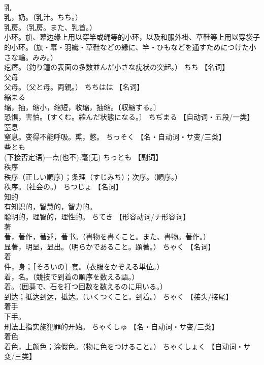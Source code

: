 \documentclass[8pt]{extreport}
\begin{document}
\begin{CJK}{UTF8}{min}
\\	乳	
\\	乳，奶。（乳汁。ちち。） 
\\	乳房。（乳房。また、乳首。） 
\\	小环。旗、幕边缘上用以穿竿或绳等的小环，以及和服外褂、草鞋等上用以穿袋子的小环。（旗・幕・羽織・草鞋などの縁に、竿・ひもなどを通すためにつけた小さな輪。みみ。） 
\\	疙瘩。（釣り鐘の表面の多数並んだ小さな疣状の突起。）	ちち		【名词】
\\	父母	
\\	父母。（父と母。両親。）	ちちはは		【名词】
\\	縮まる	
\\	缩，抽，缩小，缩短，收缩，抽缩。〔収縮する。〕 
\\	恐惧，害怕。〔すくむ。縮んだ状態になる。〕	ちぢまる		【自动词・五段/一类】
\\	窒息	
\\	窒息。变得不能呼吸。熏，憋。	ちっそく		【名・自动词・サ变/三类】
\\	些とも	
\\	(下接否定语)一点(也不);毫(无)	ちっとも		【副词】
\\	秩序	
\\	秩序（正しい順序）；条理（すじみち）；次序。（順序。） 
\\	秩序。（社会の。）	ちつじょ		【名词】
\\	知的	
\\	有知识的，智慧的，智力的。 
\\	聪明的，理智的，理性的。	ちてき		【形容动词/ナ形容词】
\\	著	
\\	著，著作，著述，著书。（書物を書くこと。また、書物。著作。） 
\\	显著，明显，显出。（明らかであること。顕著。）	ちゃく		【名词】
\\	着	
\\	件，身；［そろいの］套。（衣服をかぞえる単位。） 
\\	着，名。（競技で到着の順序を数える語。） 
\\	着。（囲碁で、石を打つ回数を数えるのに用いる。） 
\\	到达；抵达到达，抵达。（いくつくこと。到着。）	ちゃく		【接头/接尾】
\\	着手	
\\	下手。 
\\	刑法上指实施犯罪的开始。	ちゃくしゅ		【名・自动词・サ变/三类】
\\	着色	
\\	着色，上颜色；涂假色。（物に色をつけること。）	ちゃくしょく		【自动词・サ变/三类】

\end{CJK}
\end{document}
